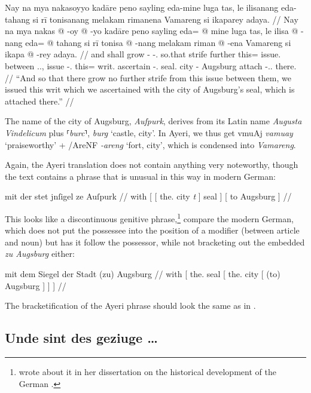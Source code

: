 \documentclass[12pt,paper=a4]{scrartcl}
\newcommand{\fw}[1]{\textit{#1}} %
\newcommand{\norm}[1]{⸢\textit{#1}⸣} %
\newcommand{\xayr}[3]{{\Tagati #1} \emph{#2} \enquote*{#3}}
\begin{document}
\ex \label{ex:11} \begingl
	\glpreamble Nay na mya nakasoyyo kadāre peno sayling eda-mine luga tas,
		le ilisanang eda-tahang si rī tonisanang melakam rimanena 
		Vamareng si ikaparey adaya. //
	\gla Nay na mya nakas @ -oy @ -yo kadāre peno sayling eda= @ mine luga 
		tas, le ilisa @ -nang eda= @ tahang si rī tonisa @ -nang 
		melakam riman @ -ena Vamareng si ikapa @ -rey adaya. //
	\glb and \GenT{} shall grow -\Neg{} -\Tsg{}.\N{} so.that strife further 
		this= issue.\Top{} between \Tsg{}.\M{}.\Loc{}, \PatT{} issue 
		-\Fpl{}.\Aarg{} this= writ.\Top{} \Rel{} \InsT{} ascertain 
		-\Fpl{}.\Aarg{} seal.\Top{} city -\Gen{} Augsburg \Rel{}
		attach -\Tsg{}.\Inan{}.\Parg{} there. //
	\glft \enquote{And so that there grow no further strife from this issue 
		between them, we issued this writ which we ascertained with the 
		city of Augsburg's seal, which is attached there.} //
\endgl \xe

The name of the city of Augsburg, \Mhg{} \fw{Auſpurk}, derives from its Latin 
name \fw{Augusta Vindelicum} plus \Mhg{} \norm{burc}, \Ohg{} \fw{burg} `castle, 
city'. In Ayeri, we thus get \xayr{vmuAj}{vamuay}{praiseworthy} + 
\xayr{/AreNF}{-areng}{fort, city}, which is condensed into \fw{Vamareng}.

Again, the Ayeri translation does not contain anything very noteworthy, though 
the \Mhg{} text contains a phrase that is unusual in this way in modern German:

\ex[exno=\ref{ex:11}.1] \begingl
	\gla mit {} {} der stet {} {} jnſigel {} {} ze Auſpurk {} //
	\glb with [ [ the.\Gen{} city \emph{t} ] seal ] [ to Augsburg ] //
\endgl \xe

This looks like a discontinuous genitive 
phrase,\footnote{\textcite[224~ff.]{demske2001} wrote about it in her 
dissertation on the historical development of the German \Np{}.} compare 
the modern German, which does not put the possessee into the position of a 
modifier (between article and noun) but has it follow the possessor, while not 
bracketing out the embedded \Pp{} \fw{zu Augsburg} either:

\ex[exno=\ref{ex:11}.2] \begingl
	\gla mit {} dem Siegel {} der Stadt {} (zu) Augsburg {} {} {} //
	\glb with [ the.\Dat{} seal [ the.\Gen{} city [ (to) Augsburg ] ] ] //
\endgl \xe

The bracketification of the Ayeri phrase should look the same as in \Nhg{}.

\subsection*{Unde sint des geziuge …}
\end{document}
